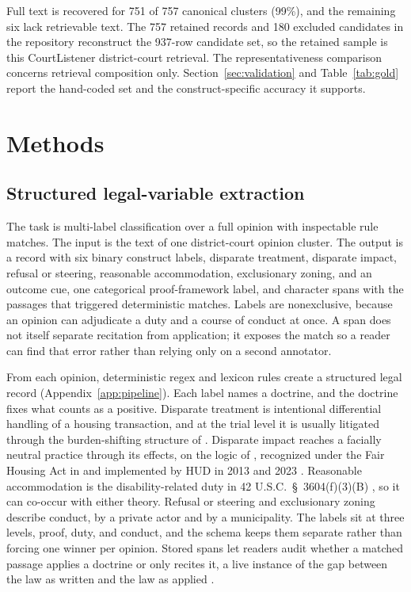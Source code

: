 \documentclass[11pt]{article}
\begin{document}
Full text is recovered for 751 of 757 canonical clusters (99\%), and the remaining six lack retrievable text. The 757 retained records and 180 excluded candidates in the repository reconstruct the 937-row candidate set, so the retained sample is this CourtListener district-court retrieval. The representativeness comparison concerns retrieval composition only. Section~\ref{sec:validation} and Table~\ref{tab:gold} report the hand-coded set and the construct-specific accuracy it supports.

\section{Methods}

\subsection{Structured legal-variable extraction}\label{sec:extraction}

The task is multi-label classification over a full opinion with inspectable rule matches. The input is the text of one district-court opinion cluster. The output is a record with six binary construct labels, disparate treatment, disparate impact, refusal or steering, reasonable accommodation, exclusionary zoning, and an outcome cue, one categorical proof-framework label, and character spans with the passages that triggered deterministic matches. Labels are nonexclusive, because an opinion can adjudicate a duty and a course of conduct at once. A span does not itself separate recitation from application; it exposes the match so a reader can find that error rather than relying only on a second annotator.

From each opinion, deterministic regex and lexicon rules create a structured legal record (Appendix~\ref{app:pipeline}). Each label names a doctrine, and the doctrine fixes what counts as a positive. Disparate treatment is intentional differential handling of a housing transaction, and at the trial level it is usually litigated through the burden-shifting structure of \citet{mcdonnell1973}. Disparate impact reaches a facially neutral practice through its effects, on the logic of \citet{griggs1971}, recognized under the Fair Housing Act in \citet{inclusive2015} and implemented by HUD in 2013 \citep{hud2013} and 2023 \citep{hud2023}. Reasonable accommodation is the disability-related duty in 42 U.S.C.\ \S~3604(f)(3)(B) \citep{fha1968}, so it can co-occur with either theory. Refusal or steering and exclusionary zoning describe conduct, by a private actor and by a municipality. The labels sit at three levels, proof, duty, and conduct, and the schema keeps them separate rather than forcing one winner per opinion. Stored spans let readers audit whether a matched passage applies a doctrine or only recites it, a live instance of the gap between the law as written and the law as applied \citep{pound1910}.
\end{document}
